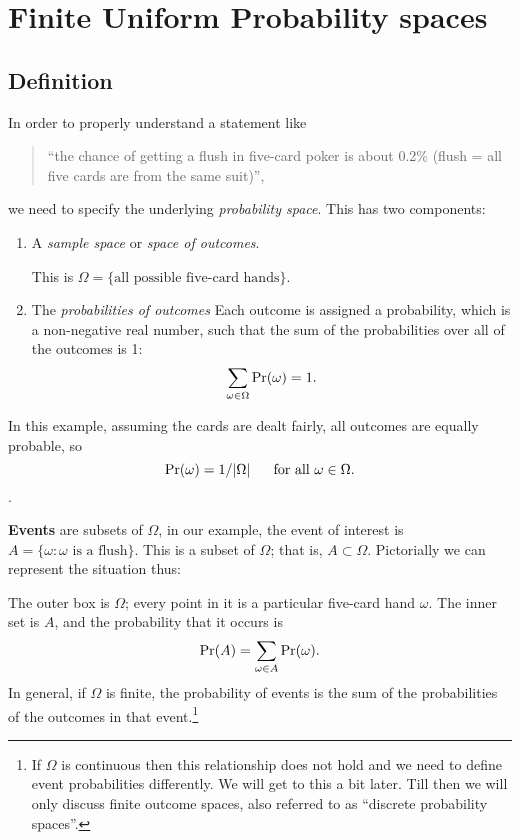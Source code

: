\chapter{Finite Uniform Probability spaces}

\section{Definition}

In order to properly understand a statement like
\begin{quote}
``the chance of getting a flush in five-card poker is about 0.2\%
(flush = all five cards are from the same suit)'',
\end{quote}
we need to specify the underlying {\it probability space}. This has two components:
\begin{enumerate}
\item A {\it sample space} or {\it space of outcomes}.

This is $\Omega = \{\mbox{all possible five-card hands}\}$.
\item The {\it probabilities of outcomes} Each outcome is assigned a
  probability, which is a non-negative real number, such that the sum
  of the probabilities over all of the outcomes is 1:
$$ \sum_{\omega \in \Omega} \mbox{\rm Pr}(\omega) = 1 .$$
\end{enumerate}

In this example, assuming the cards are dealt fairly, all outcomes are equally probable, so
$$\mbox{\rm Pr}(\omega) = 1/|\Omega| \mbox{\ \ \ \ \ for all $\omega \in \Omega$.} $$.

{\bf Events} are subsets of $\Omega$, in our example, the event of
interest is $A = \{\omega: \mbox{$\omega$ is a flush}\}$. This is a
subset of $\Omega$; that is, $A \subset \Omega$. Pictorially we can
represent the situation thus:

\begin{center}
\end{center}

\noindent
The outer box is $\Omega$; every point in it is a particular five-card hand $\omega$. The inner set is $A$, and the probability that it occurs is
$$ \mbox{\rm Pr}(A) = \sum_{\omega \in A} \mbox{\rm Pr}(\omega) .$$
In general, if $\Omega$ is finite, the probability of events is the
sum of the probabilities of the outcomes in that event.\footnote{If
  $\Omega$ is continuous then this relationship does not hold and we
  need to define event probabilities differently. We will get to this
  a bit later. Till then we will only discuss finite outcome spaces,
  also referred to as ``discrete probability spaces''.}

